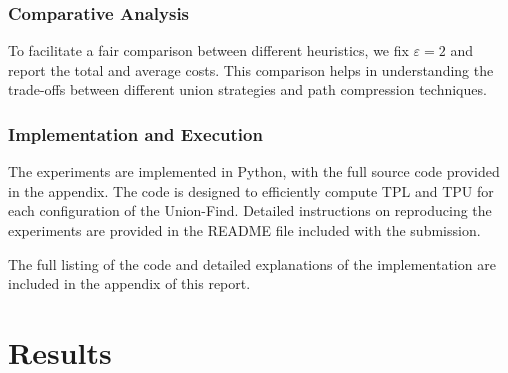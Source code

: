 \documentclass[10pt,a4paper,hidelinks]{article}
\begin{document}
\subsubsection{Comparative Analysis}
To facilitate a fair comparison between different heuristics, we fix $\varepsilon = 2$ and report the total and average costs. This comparison helps in understanding the trade-offs between different union strategies and path compression techniques.

\subsubsection{Implementation and Execution}
The experiments are implemented in Python, with the full source code provided in the appendix. The code is designed to efficiently compute TPL and TPU for each configuration of the Union-Find. Detailed instructions on reproducing the experiments are provided in the README file included with the submission.

The full listing of the code and detailed explanations of the implementation are included in the appendix of this report.

\section{Results}
\end{document}
